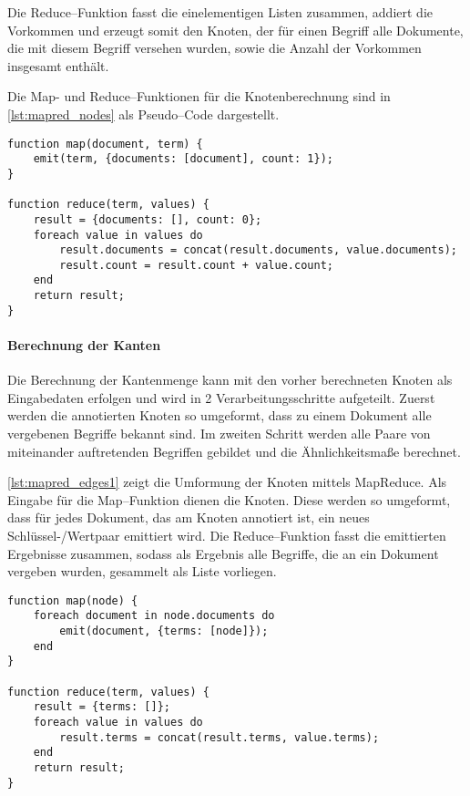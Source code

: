 Die Reduce--Funktion fasst die einelementigen Listen zusammen, addiert die Vorkommen und erzeugt somit den Knoten, der für einen Begriff alle Dokumente, die mit diesem Begriff versehen wurden, sowie die Anzahl der Vorkommen insgesamt enthält.

Die Map- und Reduce--Funktionen für die Knotenberechnung sind in \cref{lst:mapred_nodes} als Pseudo--Code dargestellt.

\begin{lstlisting}[language=pseudo, label={lst:mapred_nodes}, caption={Knotenerzeugung mit MapReduce}]
function map(document, term) {
    emit(term, {documents: [document], count: 1});
}

function reduce(term, values) {
    result = {documents: [], count: 0};
    foreach value in values do
        result.documents = concat(result.documents, value.documents);
        result.count = result.count + value.count;
    end
    return result;
}
\end{lstlisting}

\paragraph{Berechnung der Kanten}

Die Berechnung der Kantenmenge kann mit den vorher berechneten Knoten als Eingabedaten erfolgen und wird in 2 Verarbeitungsschritte aufgeteilt. Zuerst werden die annotierten Knoten so umgeformt, dass zu einem Dokument alle vergebenen Begriffe bekannt sind. Im zweiten Schritt werden alle Paare von miteinander auftretenden Begriffen gebildet und die Ähnlichkeitsmaße berechnet.

\cref{lst:mapred_edges1} zeigt die Umformung der Knoten mittels MapReduce. Als Eingabe für die Map--Funktion dienen die Knoten. Diese werden so umgeformt, dass für jedes Dokument, das am Knoten annotiert ist, ein neues Schlüssel-/Wertpaar emittiert wird. Die Reduce--Funktion fasst die emittierten Ergebnisse zusammen, sodass als Ergebnis alle Begriffe, die an ein Dokument vergeben wurden, gesammelt als Liste vorliegen.

\begin{lstlisting}[language=pseudo, label={lst:mapred_edges1}, caption={Umformung der Knoten mit MapReduce}]
function map(node) {
    foreach document in node.documents do
        emit(document, {terms: [node]});
    end
}

function reduce(term, values) {
    result = {terms: []};
    foreach value in values do
        result.terms = concat(result.terms, value.terms);
    end
    return result;
}
\end{lstlisting}

